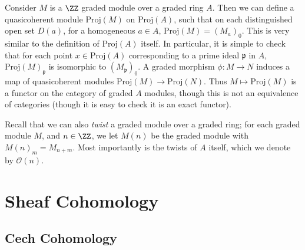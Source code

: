 Consider $M$ is a $\ZZ$ graded module over a graded ring $A$. Then we can define a quasicoherent module $\text{Proj}(M)$ on $\text{Proj}(A)$, such that on each distinguished open set $D(a)$, for a homogeneous $a \in A$, $\text{Proj}(M) = (M_a)_0$. This is very similar to the definition of $\text{Proj}(A)$ itself. In particular, it is simple to check that for each point $x \in \text{Proj}(A)$ corresponding to a prime ideal $\mathfrak{p}$ in $A$, $\text{Proj}(M)_{\mathfrak{p}}$ is isomorphic to $(M_{\mathfrak{p}})_0$. A graded morphism $\phi: M \to N$ induces a map of quasicoherent modules $\text{Proj}(M) \to \text{Proj}(N)$. Thus $M \mapsto \text{Proj}(M)$ is a functor on the category of graded $A$ modules, though this is not an equivalence of categories (though it is easy to check it is an exact functor).

Recall that we can also \emph{twist} a graded module over a graded ring; for each graded module $M$, and $n \in \ZZ$, we let $M(n)$ be the graded module with $M(n)_m = M_{n + m}$. Most importantly is the twists of $A$ itself, which we denote by $\mathcal{O}(n)$.

 




















\chapter{Sheaf Cohomology}

\section{Cech Cohomology}

